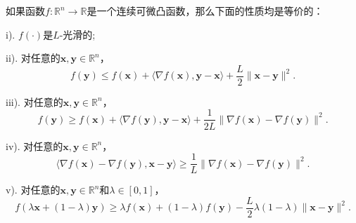 \begin{theorem}[$L$-光滑的多种刻画性质]
    如果函数$f: \mathbb{R}^{n} \rightarrow \mathbb{R}$是一个连续可微凸函数，那么下面的性质均是等价的：
\par     i). $f(\cdot)$是$L$-光滑的; 
\par    ii). 对任意的$\bm{x}, \bm{y} \in \mathbb{R}^{n}$，
    \begin{equation}
        f(\bm{y}) \leq f(\bm{x})+\langle\nabla f(\bm{x}), \bm{y}-\bm{x}\rangle+\frac{L}{2}\|\bm{x}-\bm{y}\|^{2} .
        \nonumber
    \end{equation} 
\par    iii). 对任意的$\bm{x}, \bm{y} \in \mathbb{R}^{n}$，
    \begin{equation}
        f(\bm{y}) \geq f(\bm{x})+\langle\nabla f(\bm{y}), \bm{y}-\bm{x}\rangle+\frac{1}{2 L}\|\nabla f(\bm{x})-\nabla f(\bm{y})\|^{2} .
        \nonumber
    \end{equation}
\par    iv). 对任意的$\bm{x}, \bm{y} \in \mathbb{R}^{n}$，
    \begin{equation}
        \langle\nabla f(\bm{x})-\nabla f(\bm{y}), \bm{x}-\bm{y}\rangle \geq \frac{1}{L}\|\nabla f(\bm{x})-\nabla f(\bm{y})\|^{2} .
        \nonumber
    \end{equation}
\par     v). 对任意的$\bm{x}, \bm{y} \in \mathbb{R}^{n}$和$\lambda \in[0,1]$，
    \begin{equation}
        f(\lambda \bm{x}+(1-\lambda) \bm{y}) \geq \lambda f(\bm{x})+(1-\lambda) f(\bm{y})-\frac{L}{2} \lambda(1-\lambda)\|\bm{x}-\bm{y}\|^{2} .
        \nonumber
    \end{equation}
    \label{thm1_1}
\end{theorem}
